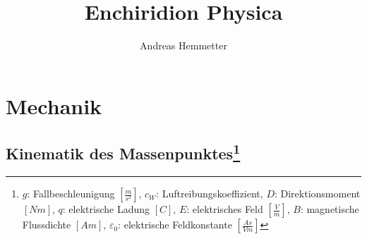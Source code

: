 \documentclass[12pt,a4paper]{article}
\title{Enchiridion Physica}
\author{Andreas Hemmetter}
\renewcommand{\=}[1]{\stackrel{#1}{=}}
\theoremstyle{definition}
\theoremstyle{remark}
\begin{document}
\maketitle
\thispagestyle{empty}
\newpage

\begin{multicols}{2}
\tableofcontents
\end{multicols}


\newpage
{}
\section{Mechanik}

\subsection[Kinematik des Massenpunktes]{Kinematik des Massenpunktes\let\thefootnote\relax\footnote{$g$: Fallbeschleunigung $[\frac{m}{s^2}]$, $c_W$: Luftreibungskoeffizient, $D$: Direktionsmoment $[Nm]$, $q$: elektrische Ladung $[C]$, $E$: elektrisches Feld $[\frac{V}{m}]$, $B$: magnetische Flussdichte $[Am]$, $\varepsilon_0$: elektrische Feldkonstante $[\frac{As}{Vm}]$}}
\end{document}
